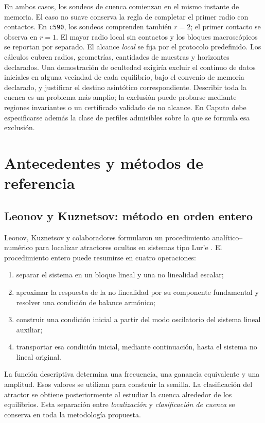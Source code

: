 En ambos casos, los sondeos de cuenca comienzan en el mismo instante de memoria.
El caso no suave conserva la regla de completar el primer radio con contactos.
En \texttt{c590}, los sondeos comprenden también \(r=2\); el primer contacto
se observa en \(r=1\). El mayor radio local sin contactos y los
bloques macroscópicos se reportan por separado. El alcance \emph{local} se fija
por el protocolo predefinido. Los cálculos cubren radios, geometrías,
cantidades de muestras y horizontes declarados. Una demostración de ocultedad
exigiría excluir el continuo de datos iniciales en alguna vecindad de cada
equilibrio, bajo el convenio de memoria declarado, y justificar el destino
asintótico correspondiente. Describir toda la cuenca es un problema más
amplio; la exclusión puede probarse mediante regiones invariantes o un
certificado validado de no alcance. En Caputo debe especificarse además la
clase de perfiles admisibles sobre la que se formula esa exclusión.

\section{Antecedentes y métodos de referencia}
\label{sec:antecedentes}

\subsection{Leonov y Kuznetsov: método en orden entero}

Leonov, Kuznetsov y colaboradores formularon un procedimiento
analítico--numérico para localizar atractores ocultos en sistemas tipo Lur'e
\cite{LeonovKuznetsov2013,KuznetsovEtAl2017}. El procedimiento entero puede
resumirse en cuatro operaciones:

\begin{enumerate}
  \item separar el sistema en un bloque lineal y una no linealidad escalar;
  \item aproximar la respuesta de la no linealidad por su componente
  fundamental y resolver una condición de balance armónico;
  \item construir una condición inicial a partir del modo oscilatorio del
  sistema lineal auxiliar;
  \item transportar esa condición inicial, mediante continuación, hasta el
  sistema no lineal original.
\end{enumerate}

La función descriptiva determina una frecuencia, una ganancia equivalente y
una amplitud. Esos valores se utilizan para construir la semilla. La
clasificación del atractor se obtiene posteriormente al estudiar la cuenca
alrededor de los equilibrios. Esta separación entre \emph{localización} y
\emph{clasificación de cuenca} se conserva en toda la metodología propuesta.

